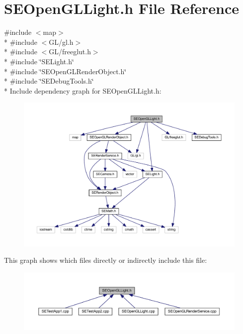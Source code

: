\section{S\+E\+Open\+G\+L\+Light.\+h File Reference}
\label{_s_e_open_g_l_light_8h}
{\ttfamily \#include $<$map$>$}\\*
{\ttfamily \#include $<$G\+L/gl.\+h$>$}\\*
{\ttfamily \#include $<$G\+L/freeglut.\+h$>$}\\*
{\ttfamily \#include \char`\"{}S\+E\+Light.\+h\char`\"{}}\\*
{\ttfamily \#include \char`\"{}S\+E\+Open\+G\+L\+Render\+Object.\+h\char`\"{}}\\*
{\ttfamily \#include \char`\"{}S\+E\+Debug\+Tools.\+h\char`\"{}}\\*
Include dependency graph for S\+E\+Open\+G\+L\+Light.\+h\+:
\nopagebreak
\begin{figure}[H]
\begin{center}
\leavevmode
\includegraphics[width=350pt]{_s_e_open_g_l_light_8h__incl}
\end{center}
\end{figure}
This graph shows which files directly or indirectly include this file\+:
\nopagebreak
\begin{figure}[H]
\begin{center}
\leavevmode
\includegraphics[width=350pt]{_s_e_open_g_l_light_8h__dep__incl}
\end{center}
\end{figure}
